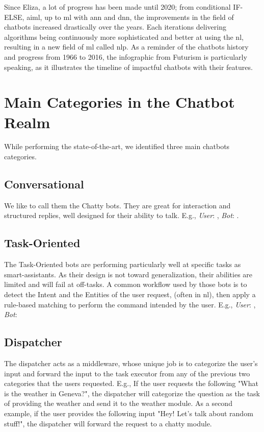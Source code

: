 Since Eliza, a lot of progress has been made until 2020; from conditional IF-ELSE, \gls{aiml}, up to \gls{ml} with \gls{ann} and \gls{dnn}, the improvements in the field of chatbots increased drastically over the years. Each iterations delivering algorithms being continuously more sophisticated and better at using the \gls{nl}, resulting in a new field of \gls{ml} called \gls{nlp}. As a reminder of the chatbots history and progress from 1966 to 2016, the infographic \autocite{online:futurism_history_infography} from Futurism is particularly speaking, as it illustrates the timeline of impactful chatbots with their features. 


\section{Main Categories in the Chatbot Realm}
\label{chatbot:main-cats}
While performing the state-of-the-art, we identified three main chatbots categories. 

\subsection{Conversational}
We like to call them the Chatty bots. They are great for interaction and structured replies, well designed for their ability to talk. E.g., \textit{User}: , \textit{Bot}: .

\subsection{Task-Oriented}
The Task-Oriented bots are performing particularly well at specific tasks as smart-assistants. As their design is not toward generalization, their abilities are limited and will fail at off-tasks. A common workflow used by those bots is to detect the Intent and the Entities of the user request, (often in \gls{nl}), then apply a rule-based matching to perform the command intended by the user. E.g., \textit{User}: , \textit{Bot}: 

\subsection{Dispatcher}
The dispatcher acts as a middleware, whose unique job is to categorize the user's input and forward the input to the task executor from any of the previous two categories that the users requested. E.g., If the user requests the following "What is the weather in Geneva?", the dispatcher will categorize the question as the task of providing the weather and send it to the weather module. As a second example, if the user provides the following input "Hey! Let's talk about random stuff!", the dispatcher will forward the request to a chatty module.


